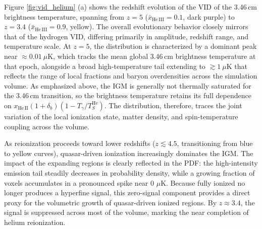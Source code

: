 \documentclass[apj,twocolumn, appendixfloats, twocolappendix, numberedappendix, tighten]{openjournal}
\begin{document}




Figure \ref{fig:vid_helium} (a) shows the redshift evolution of the VID of the 3.46\,cm brightness temperature, spanning from $z = 5$ ($\bar{x}_\mathrm{He\,III} = 0.1$, dark purple) to $z = 3.4$ ($\bar{x}_\mathrm{He\,III} = 0.9$, yellow). The overall evolutionary behavior closely mirrors that of the hydrogen VID, differing primarily in amplitude, redshift range, and temperature scale. At $z = 5$, the distribution is characterized by a dominant peak near $\approx 0.01\ \mu\mathrm{K}$, which tracks the mean global 3.46\,cm brightness temperature at that epoch, alongside a broad high-temperature tail extending to $\gtrsim 1\ \mu\mathrm{K}$ that reflects the range of local  fractions and baryon overdensities across the simulation volume. As emphasized above, the IGM is generally not thermally saturated for the 3.46\,cm transition, so the brightness temperature retains its full dependence on $x_\mathrm{He\,II}(1+\delta_b)(1-T_\gamma/T_S^\mathrm{He})$. The distribution, therefore, traces the joint variation of the local ionization state, matter density, and spin-temperature coupling across the volume.


As reionization proceeds toward lower redshifts ($z \lesssim 4.5$, transitioning from blue to yellow curves), quasar-driven ionization increasingly dominates the IGM. The impact of the expanding  regions is clearly reflected in the PDF: the high-intensity emission tail steadily decreases in probability density, while a growing fraction of voxels accumulates in a pronounced spike near $0$ $\mu$K. Because fully ionized  no longer produces a hyperfine signal, this zero-signal component provides a direct proxy for the volumetric growth of quasar-driven ionized regions. By $z \approx 3.4$, the signal is suppressed across most of the volume, marking the near completion of helium reionization.


\end{document}
